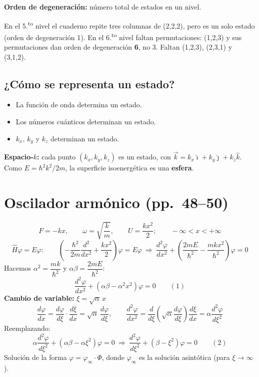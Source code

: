 \documentclass[11pt,a4paper]{article}
\newcommand{\pags}[1]{{\normalfont\small\color{gris}(pp.~#1)}}
\newcommand{\ii}{\hat{\imath}}
\newcommand{\jj}{\hat{\jmath}}
\newcommand{\kk}{\hat{k}}
\begin{document}
\textbf{Orden de degeneración:} número total de estados en un nivel.

\begin{obs}
En el 5.\textsuperscript{to} nivel el cuaderno repite tres columnas de (2,2,2), pero es un solo estado (orden de degeneración 1).
En el 6.\textsuperscript{to} nivel faltan permutaciones: (1,2,3) y sus permutaciones dan orden de degeneración \textbf{6}, no 3.
Faltan (1,2,3), (2,3,1) y (3,1,2).
\end{obs}

\subsection{¿Cómo se representa un estado?}
\begin{itemize}
  \item La función de onda determina un estado.
  \item Los números cuánticos determinan un estado.
  \item $k_x$, $k_y$ y $k_z$ determinan un estado.
\end{itemize}
\textbf{Espacio-$k$:} cada punto $(k_x,k_y,k_z)$ es un estado, con $\vec k=k_x\ii+k_y\jj+k_z\kk$. Como $E=\hbar^2k^2/2m$,
la superficie isoenergética es una \textbf{esfera}.

\section{Oscilador armónico \pags{48--50}}

\[
F=-kx,\qquad \omega=\sqrt{\frac km},\qquad U=\frac{kx^2}{2};\qquad -\infty<x<+\infty
\]
\[
\hat H\varphi=E\varphi:\qquad \left(-\frac{\hbar^2}{2m}\frac{d^2}{dx^2}+\frac{kx^2}{2}\right)\varphi=E\varphi
\ \Rightarrow\
\frac{d^2\varphi}{dx^2}+\left(\frac{2mE}{\hbar^2}-\frac{mkx^2}{\hbar^2}\right)\varphi=0
\]
Hacemos $\alpha^2=\dfrac{mk}{\hbar^2}$ y $\alpha\beta=\dfrac{2mE}{\hbar^2}$:
\[
\frac{d^2\varphi}{dx^2}+(\alpha\beta-\alpha^2x^2)\varphi=0\qquad(1)
\]
\textbf{Cambio de variable:} $\xi=\sqrt\alpha\,x$
\[
\frac{d\varphi}{dx}=\frac{d\varphi}{d\xi}\cdot\frac{d\xi}{dx}=\sqrt\alpha\,\frac{d\varphi}{d\xi},\qquad
\frac{d^2\varphi}{dx^2}=\frac{d}{d\xi}\left(\sqrt\alpha\frac{d\varphi}{d\xi}\right)\frac{d\xi}{dx}=\alpha\frac{d^2\varphi}{d\xi^2}
\]
Reemplazando:
\[
\alpha\frac{d^2\varphi}{d\xi^2}+(\alpha\beta-\alpha\xi^2)\varphi=0\ \Rightarrow\ \frac{d^2\varphi}{d\xi^2}+(\beta-\xi^2)\varphi=0\qquad(2)
\]
Solución de la forma $\varphi=\varphi_\infty\cdot\Phi$, donde $\varphi_\infty$ es la solución asintótica (para $\xi\to\infty$).
\end{document}
